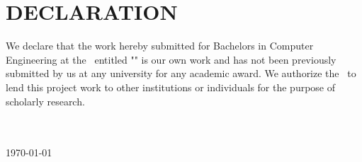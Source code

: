 \section*{DECLARATION}
\vspace{0.5cm}

We declare that the work hereby submitted for Bachelors in Computer Engineering at the \thecampus \ entitled "\textbf{\thetitle}" is our own work and has not been previously submitted by us at any university for any academic award.
We authorize the \thecampus \ to lend this project work
to other institutions or individuals for the purpose of scholarly research.

\vspace{1cm}
\noindent\textbf{ {\theauthor}}\\
\\
\today
